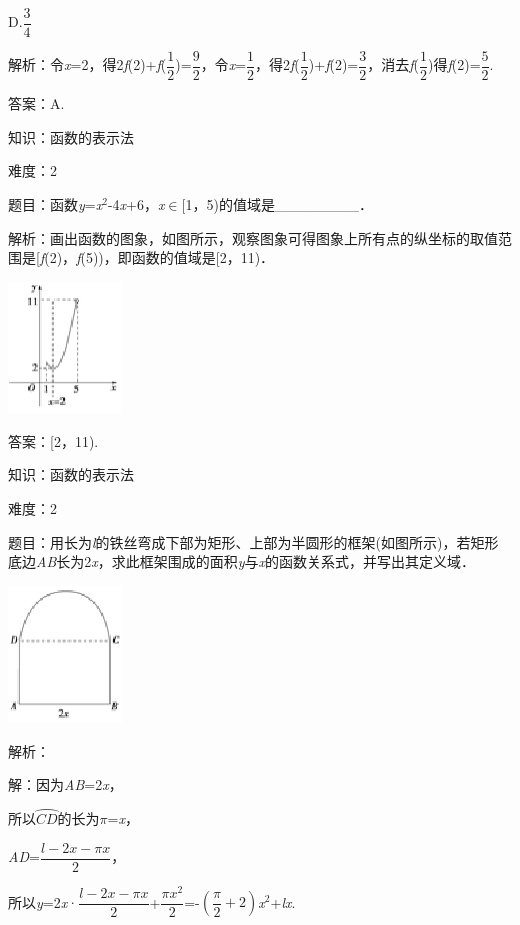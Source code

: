 \documentclass{article} %
\begin{document}
D.$\dfrac{3}{4}$　

解析：令\textit{x}=2，得2\textit{f}(2)+\textit{f}($\dfrac{1}{2}$)=$\dfrac{9}{2}$，令\textit{x}=$\dfrac{1}{2}$，得2\textit{f}(\textit{$\dfrac{1}{2}$})+\textit{f}(2)=$\dfrac{3}{2}$，消去\textit{f}($\dfrac{1}{2}$)得\textit{f}(2)=$\dfrac{5}{2}$.

答案：A.

知识：函数的表示法

难度：2

题目：函数\textit{y}=\textit{x}${}^{2}$-4\textit{x}+6，\textit{x}$\mathrm{\in}$[1，5)的值域是\_\_\_\_\_\_\_\_．

解析：画出函数的图象，如图所示，观察图象可得图象上所有点的纵坐标的取值范围是[\textit{f}(2)，\textit{f}(5))，即函数的值域是[2，11)．

\includegraphics*[width=1.19in, height=1.37in, keepaspectratio=false]{image28}

答案：[2，11).

知识：函数的表示法

难度：2

题目：用长为\textit{l}的铁丝弯成下部为矩形、上部为半圆形的框架(如图所示)，若矩形底边\textit{AB}长为2\textit{x}，求此框架围成的面积\textit{y}与\textit{x}的函数关系式，并写出其定义域．

\includegraphics*[width=1.19in, height=1.43in, keepaspectratio=false]{image29}

解析：

解：因为\textit{AB}=2\textit{x}，

所以$\wideparen{CD}$的长为$\pi$=\textit{x}，

\textit{AD}=$\dfrac{l-2x-\pi x}{2}$，

所以\textit{y}=2\textit{x}·$\dfrac{l-2x-\pi x}{2}$+$\dfrac{\pi x^{2}}{2}$=-$(\dfrac{\pi}{2}+2)$\textit{x}${}^{2}$+\textit{lx}.
\end{document}
